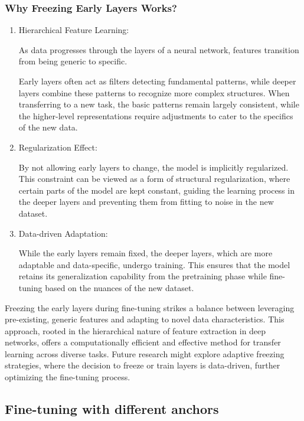 \documentclass{article}
\begin{document}
\subsubsection{Why Freezing Early Layers Works?}
\begin{enumerate}
  \item Hierarchical Feature Learning: 
  
  As data progresses through the layers of a neural network, features transition from being generic to specific. 

Early layers often act as filters detecting fundamental patterns, while deeper layers combine these patterns to recognize more complex structures. 
When transferring to a new task, the basic patterns remain largely consistent, while the higher-level representations require adjustments to cater to the specifics of the new data.

\item Regularization Effect: 

By not allowing early layers to change, the model is implicitly regularized. This constraint can be viewed as a form of structural regularization, where certain parts of the model are kept constant, guiding the learning process in the deeper layers and preventing them from fitting to noise in the new dataset.

\item Data-driven Adaptation: 

While the early layers remain fixed, the deeper layers, which are more adaptable and data-specific, undergo training. This ensures that the model retains its generalization capability from the pretraining phase while fine-tuning based on the nuances of the new dataset.
\end{enumerate}

Freezing the early layers during fine-tuning strikes a balance between leveraging pre-existing, generic features and adapting to novel data characteristics. This approach, rooted in the hierarchical nature of feature extraction in deep networks, offers a computationally efficient and effective method for transfer learning across diverse tasks. Future research might explore adaptive freezing strategies, where the decision to freeze or train layers is data-driven, further optimizing the fine-tuning process.


\subsection{Fine-tuning with different anchors}
\end{document}
